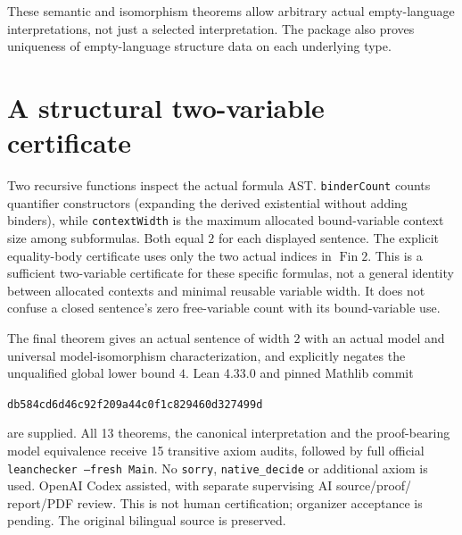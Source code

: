 \documentclass[11pt]{article}
\begin{document}
These semantic and isomorphism theorems allow arbitrary actual
empty-language interpretations, not just a selected interpretation.
The package also proves uniqueness of empty-language structure
data on each underlying type.

\newpage
\section{A structural two-variable certificate}
Two recursive functions inspect the actual formula AST.
\texttt{binderCount} counts quantifier constructors (expanding
the derived existential without adding binders), while
\texttt{contextWidth} is the maximum allocated bound-variable
context size among subformulas. Both equal $2$ for each displayed
sentence. The explicit equality-body certificate uses only the
two actual indices in $\operatorname{Fin}2$.
This is a sufficient two-variable certificate for these specific
formulas, not a general identity between allocated contexts and
minimal reusable variable width. It does not confuse a closed
sentence's zero free-variable count with its bound-variable use.

The final theorem gives an actual sentence of width $2$ with an
actual model and universal model-isomorphism characterization,
and explicitly negates the unqualified global lower bound $4$.
Lean 4.33.0 and pinned Mathlib commit
\begin{center}\small\texttt{db584cd6d46c92f209a44c0f1c829460d327499d}\end{center}
are supplied. All 13 theorems, the canonical interpretation and
the proof-bearing model equivalence receive 15 transitive axiom
audits, followed by full official \texttt{leanchecker --fresh Main}.
No \texttt{sorry}, \texttt{native\_decide} or additional axiom is used.
OpenAI Codex assisted, with separate supervising AI source/proof/
report/PDF review. This is not human certification; organizer
acceptance is pending. The original bilingual source is preserved.
\end{document}
